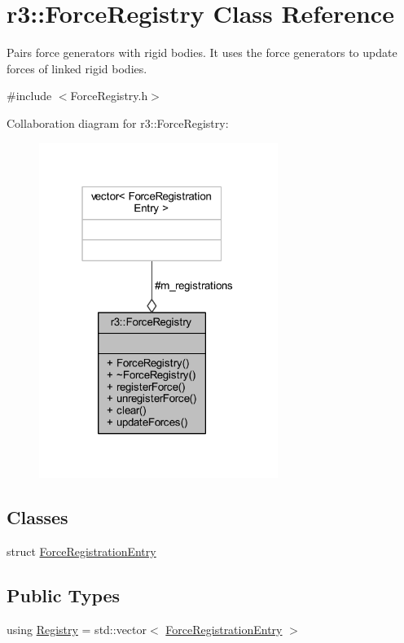 \hypertarget{classr3_1_1_force_registry}{}\section{r3\+:\+:Force\+Registry Class Reference}
\label{classr3_1_1_force_registry}


Pairs force generators with rigid bodies. It uses the force generators to update forces of linked rigid bodies.  




{\ttfamily \#include $<$Force\+Registry.\+h$>$}



Collaboration diagram for r3\+:\+:Force\+Registry\+:\nopagebreak
\begin{figure}[H]
\begin{center}
\leavevmode
\includegraphics[width=220pt]{classr3_1_1_force_registry__coll__graph}
\end{center}
\end{figure}
\subsection*{Classes}
\begin{DoxyCompactItemize}
\item 
struct \mbox{\hyperlink{structr3_1_1_force_registry_1_1_force_registration_entry}{Force\+Registration\+Entry}}
\end{DoxyCompactItemize}
\subsection*{Public Types}
\begin{DoxyCompactItemize}
\item 
using \mbox{\hyperlink{classr3_1_1_force_registry_a91449a71b1a33d773ef787ae56ae9b2d}{Registry}} = std\+::vector$<$ \mbox{\hyperlink{structr3_1_1_force_registry_1_1_force_registration_entry}{Force\+Registration\+Entry}} $>$
\end{DoxyCompactItemize}
